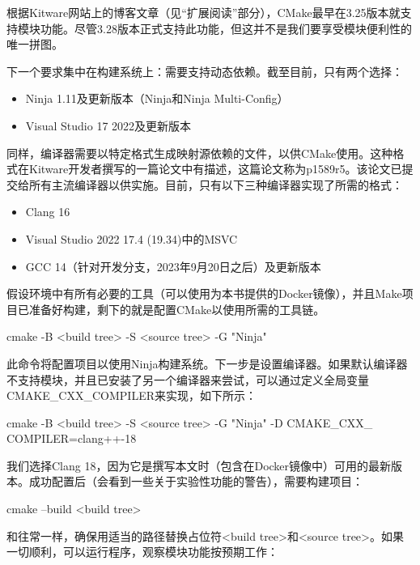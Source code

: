 
根据Kitware网站上的博客文章（见“扩展阅读”部分），CMake最早在3.25版本就支持模块功能。尽管3.28版本正式支持此功能，但这并不是我们要享受模块便利性的唯一拼图。

下一个要求集中在构建系统上：需要支持动态依赖。截至目前，只有两个选择：

\begin{itemize}
\item
Ninja 1.11及更新版本（Ninja和Ninja Multi-Config）

\item
Visual Studio 17 2022及更新版本
\end{itemize}

同样，编译器需要以特定格式生成映射源依赖的文件，以供CMake使用。这种格式在Kitware开发者撰写的一篇论文中有描述，这篇论文称为p1589r5。该论文已提交给所有主流编译器以供实施。目前，只有以下三种编译器实现了所需的格式：

\begin{itemize}
\item
Clang 16

\item
Visual Studio 2022 17.4 (19.34)中的MSVC

\item
GCC 14（针对开发分支，2023年9月20日之后）及更新版本
\end{itemize}

假设环境中有所有必要的工具（可以使用为本书提供的Docker镜像），并且Make项目已准备好构建，剩下的就是配置CMake以使用所需的工具链。

\begin{shell}
cmake -B <build tree> -S <source tree> -G "Ninja"
\end{shell}

此命令将配置项目以使用Ninja构建系统。下一步是设置编译器。如果默认编译器不支持模块，并且已安装了另一个编译器来尝试，可以通过定义全局变量CMAKE\_CXX\_COMPILER来实现，如下所示：

\begin{shell}
cmake -B <build tree> -S <source tree> -G "Ninja" -D CMAKE_CXX_ COMPILER=clang++-18
\end{shell}

我们选择Clang 18，因为它是撰写本文时（包含在Docker镜像中）可用的最新版本。成功配置后（会看到一些关于实验性功能的警告），需要构建项目：

\begin{shell}
cmake --build <build tree>
\end{shell}

和往常一样，确保用适当的路径替换占位符<build tree>和<source tree>。如果一切顺利，可以运行程序，观察模块功能按预期工作：

